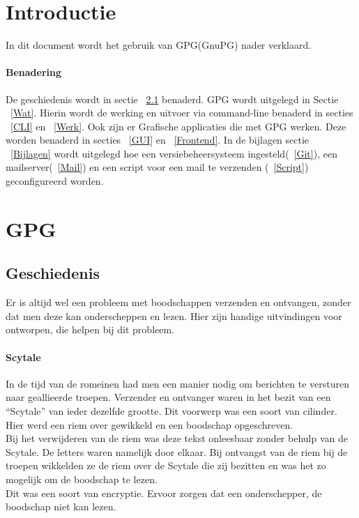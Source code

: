 \documentclass[12pt]{article}
\begin{document}
	\maketitle

	\newpage
	\tableofcontents
	
	\newpage
		\section{Introductie}
			In dit document wordt het gebruik van GPG(GnuPG) nader verklaard.

		\paragraph{Benadering}
			De geschiedenis wordt in sectie ~\ref{Geschiedenis} benaderd.
			GPG wordt uitgelegd in Sectie ~\ref{Wat}.
			Hierin wordt de werking en uitvoer via command-line benaderd in secties ~\ref{CLI} en ~\ref{Werk}.
			Ook zijn er Grafische applicaties die met GPG werken. Deze worden benaderd in secties ~\ref{GUI} en ~\ref{Frontend}.
			In de bijlagen sectie ~\ref{Bijlagen} wordt uitgelegd hoe een versiebeheersysteem ingesteld(~\ref{Git}), een mailserver(~\ref{Mail}) 
			en een script voor een mail te verzenden (~\ref{Script}) geconfigureerd worden.
			

		\newpage
		\section{GPG}\label{GPG}
			\subsection{Geschiedenis}\label{Geschiedenis}
				Er is altijd wel een probleem met boodschappen verzenden en ontvangen, zonder dat men deze kan onderscheppen en lezen. Hier zijn handige uitvindingen voor ontworpen, 								die helpen bij dit probleem.

			\paragraph{Scytale}
				In de tijd van de romeinen had men een manier nodig om berichten te versturen naar geallieerde troepen. Verzender en ontvanger waren in het bezit van een 												\textquotedblleft Scytale\textquotedblright{} van ieder dezelfde grootte. Dit voorwerp was een soort van cilinder. Hier werd een riem over gewikkeld en een boodschap 						opgeschreven.\\
				Bij het verwijderen van de riem was deze tekst onleesbaar zonder behulp van de Scytale. De letters waren namelijk door elkaar. Bij ontvangst van de riem bij de 										troepen wikkelden ze de riem over de Scytale die zij bezitten en was het zo mogelijk om de boodschap te lezen.\\
				Dit was een soort van encryptie. Ervoor zorgen dat een onderschepper, de boodschap niet kan lezen.
\end{document}
